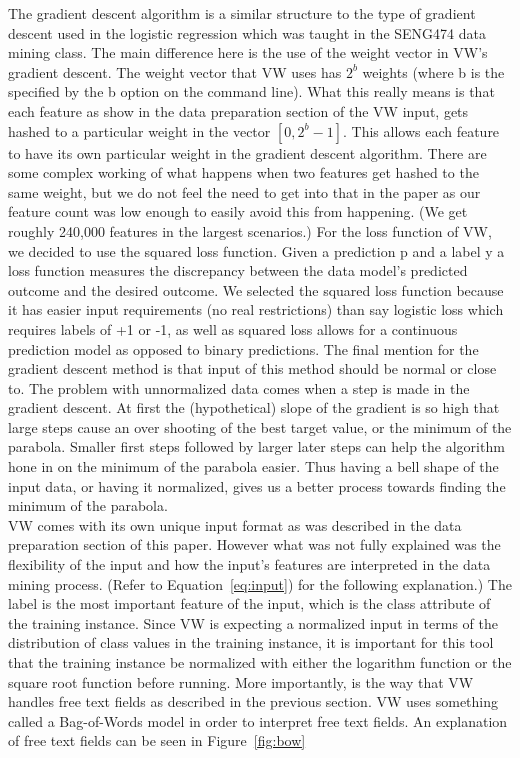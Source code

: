 The gradient descent algorithm is a similar structure to the type of gradient descent used in the logistic regression which was taught
in the SENG474 data mining class. The main difference here is the use of the weight vector in VW's gradient descent. The weight vector
that VW uses has $2^b$ weights (where b is the specified by the b option on the command line). What this really means is that each feature
as show in the data preparation section of the VW input, gets hashed to a particular weight in the vector $[0, 2^b-1]$. This allows each
feature to have its own particular weight in the gradient descent algorithm. There are some complex working of what happens when two
features get hashed to the same weight, but we do not feel the need to get into that in the paper as our feature count was low enough
to easily avoid this from happening. (We get roughly 240,000 features in the largest scenarios.) For the loss function of VW, we decided
to use the squared loss function. Given a prediction p and a label y a loss function measures the discrepancy between the data model's
predicted outcome and the desired outcome. We selected the squared loss function because it has easier input requirements (no real
restrictions) than say logistic loss which requires labels of +1 or -1, as well as squared loss allows for a continuous prediction model
as opposed to binary predictions. The final mention for the gradient descent method is that input of this method should be normal
or close to. The problem with unnormalized data comes when a step is made in the gradient descent. At first the (hypothetical) slope
of the gradient is so high that large steps cause an over shooting of the best target value, or the minimum of the parabola. Smaller
first steps followed by larger later steps can help the algorithm hone in on the minimum of the parabola easier. Thus having a bell
shape of the input data, or having it normalized, gives us a better process towards finding the minimum of the parabola.\\

VW comes with its own unique input format as was described in the data preparation section of this paper. However what was not fully
explained was the flexibility of the input and how the input's features are interpreted in the data mining process. (Refer to Equation~\ref{eq:input})
for the following explanation.) The label is the most important feature of the input, which is the class attribute of the training
instance. Since VW is expecting a normalized input in terms of the distribution of class values in the training instance, it is important
for this tool that the training instance be normalized with either the logarithm function or the square root function before running. More
importantly, is the way that VW handles free text fields as described in the previous section. VW uses something called a Bag-of-Words
model in order to interpret free text fields. An explanation of free text fields can be seen in Figure~\ref{fig:bow}

